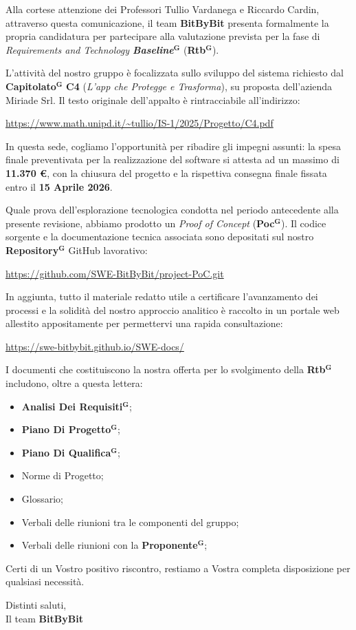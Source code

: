 \documentclass[a4paper,12pt]{article}
\newcommand{\term}[1]{\textbf{#1}$^\mathbf{G}$}
\begin{document}
\begin{flushleft}
Alla cortese attenzione dei Professori Tullio Vardanega e Riccardo Cardin,\\[0.3cm]
attraverso questa comunicazione, il team \textbf{BitByBit} presenta formalmente la propria candidatura per partecipare alla valutazione prevista per la fase di \textit{Requirements and Technology \term{Baseline}} (\term{Rtb}).

L'attività del nostro gruppo è focalizzata sullo sviluppo del sistema richiesto dal \term{Capitolato} \textbf{C4} (\textit{L'app che Protegge e Trasforma}), su proposta dell'azienda Miriade Srl. Il testo originale dell'appalto è rintracciabile all'indirizzo:
\begin{center}
    \url{https://www.math.unipd.it/~tullio/IS-1/2025/Progetto/C4.pdf}
\end{center}

In questa sede, cogliamo l'opportunità per ribadire gli impegni assunti: la spesa finale preventivata per la realizzazione del software si attesta ad un massimo di \textbf{11.370 \euro}, con la chiusura del progetto e la rispettiva consegna finale fissata entro il \textbf{15 Aprile 2026}.

Quale prova dell'esplorazione tecnologica condotta nel periodo antecedente alla presente revisione, abbiamo prodotto un \textit{Proof of Concept} (\term{Poc}). Il codice sorgente e la documentazione tecnica associata sono depositati sul nostro \term{Repository} GitHub lavorativo:
\begin{center}
    \url{https://github.com/SWE-BitByBit/project-PoC.git}
\end{center}

In aggiunta, tutto il materiale redatto utile a certificare l'avanzamento dei processi e la solidità del nostro approccio analitico è raccolto in un portale web allestito appositamente per permettervi una rapida consultazione:
\begin{center}
    \url{https://swe-bitbybit.github.io/SWE-docs/}
\end{center}

I documenti che costituiscono la nostra offerta per lo svolgimento della \term{Rtb} includono, oltre a questa lettera:
\begin{itemize}
    \item \term{Analisi Dei Requisiti};
    \item \term{Piano Di Progetto};
    \item \term{Piano Di Qualifica};
    \item Norme di Progetto;
    \item Glossario;
    \item Verbali delle riunioni tra le componenti del gruppo;
    \item Verbali delle riunioni con la \term{Proponente};
\end{itemize}

Certi di un Vostro positivo riscontro, restiamo a Vostra completa disposizione per qualsiasi necessità.

\vspace{0.8cm}
Distinti saluti,\\
\vspace{0.2cm}
Il team \textbf{BitByBit}
\end{flushleft}
\end{document}
